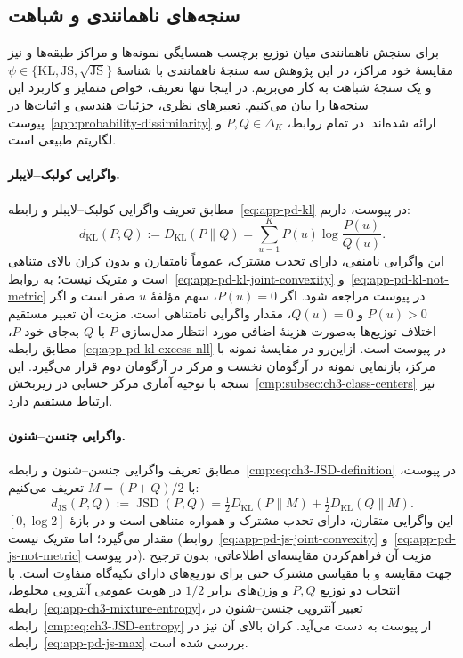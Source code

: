 \subsection{سنجه‌های ناهمانندی و شباهت}
\label{cmp:subsec:ch3-decision-dissimilarities}
برای سنجش ناهمانندی میان توزیع برچسب همسایگی نمونه‌ها
و مراکز طبقه‌ها و نیز مقایسهٔ خود مراکز، در این پژوهش
سه سنجهٔ ناهمانندی با شناسهٔ
$\psi\in\{\mathrm{KL},\mathrm{JS},\sqrt{\mathrm{JS}}\}$
و یک سنجهٔ شباهت به کار می‌بریم. در اینجا تنها تعریف،
خواص متمایز و کاربرد این سنجه‌ها را بیان می‌کنیم.
تعبیرهای نظری، جزئیات هندسی و اثبات‌ها در
پیوست~\ref{app:probability-dissimilarity} ارائه شده‌اند.
در تمام روابط، $P,Q\in\Delta_K$ و لگاریتم طبیعی است.

\paragraph{واگرایی کولبک--لایبلر.}
مطابق تعریف واگرایی کولبک--لایبلر \cite{CoverThomas2006} و رابطه~\eqref{eq:app-pd-kl} در پیوست، داریم:
\begin{equation}\label{cmp:eq:ch3-KL-definition}
d_{\mathrm{KL}}(P,Q):=D_{\mathrm{KL}}(P\|Q)
=\sum_{u=1}^{K}P(u)\log\frac{P(u)}{Q(u)}.
\end{equation}
این واگرایی نامنفی، دارای تحدب مشترک، عموماً نامتقارن
و بدون کران بالای متناهی است و متریک نیست؛
به روابط~\eqref{eq:app-pd-kl-joint-convexity}
و~\eqref{eq:app-pd-kl-not-metric} در پیوست مراجعه شود.
اگر $P(u)=0$، سهم مؤلفهٔ $u$ صفر است و اگر
$P(u)>0$ و $Q(u)=0$، مقدار واگرایی نامتناهی است.
مزیت آن تعبیر مستقیم اختلاف توزیع‌ها به‌صورت هزینهٔ
اضافی مورد انتظار مدل‌سازی $P$ با $Q$ به‌جای خود $P$، مطابق
رابطه~\eqref{eq:app-pd-kl-excess-nll} در پیوست است.
ازاین‌رو در مقایسهٔ نمونه با مرکز، بازنمایی نمونه
در آرگومان نخست و مرکز در آرگومان دوم قرار می‌گیرد.
این سنجه با توجیه آماری مرکز حسابی در
زیربخش~\ref{cmp:subsec:ch3-class-centers} نیز ارتباط مستقیم دارد.

\paragraph{واگرایی جنسن--شنون.}
مطابق تعریف واگرایی جنسن--شنون \cite{Lin1991JensenShannon} و رابطه~\eqref{cmp:eq:ch3-JSD-definition} در پیوست،
با $M=(P+Q)/2$ تعریف می‌کنیم:
\begin{equation}\label{cmp:eq:ch3-decision-js}
d_{\mathrm{JS}}(P,Q):=\operatorname{JSD}(P,Q)
=\tfrac12 D_{\mathrm{KL}}(P\|M)+\tfrac12 D_{\mathrm{KL}}(Q\|M).
\end{equation}
این واگرایی متقارن، دارای تحدب مشترک و همواره متناهی
است و در بازهٔ $[0,\log2]$ مقدار می‌گیرد؛ اما متریک نیست
(روابط~\eqref{eq:app-pd-js-joint-convexity}
و~\eqref{eq:app-pd-js-not-metric} در پیوست).
مزیت آن فراهم‌کردن مقایسه‌ای اطلاعاتی، بدون ترجیح
جهت مقایسه و با مقیاسی مشترک حتی برای توزیع‌های دارای
تکیه‌گاه متفاوت است. با انتخاب دو توزیع $P,Q$ و
وزن‌های برابر $1/2$ در هویت عمومی آنتروپی مخلوط،
رابطه~\eqref{eq:app-ch3-mixture-entropy}،
تعبیر آنتروپی جنسن--شنون در
رابطه~\eqref{cmp:eq:ch3-JSD-entropy} از پیوست به دست
می‌آید. کران بالای آن نیز در
رابطه~\eqref{eq:app-pd-js-max} بررسی شده است.


